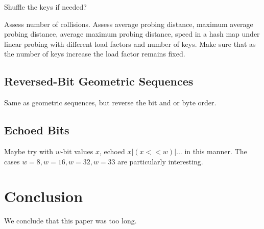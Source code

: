 \documentclass{article}
\begin{document}
Shuffle the keys if needed?

Assess number of collisions.
Assess average probing distance, 
maximum average probing distance, 
average maximum probing distance, 
speed in a hash map under linear probing with different load factors and number of keys.  Make sure that as the number of keys increase the load factor remains fixed.

\subsection{Reversed-Bit Geometric Sequences}

Same as geometric sequences, but reverse the bit and or byte order.



\subsection{Echoed Bits}


Maybe try with $w$-bit values $x$, echoed $x | (x<<w) |...$ in this manner. The cases $w=8, w=16, w=32, w=33$ are particularly interesting.

\section{Conclusion}

We conclude that this paper was too long.


 
\end{document}
